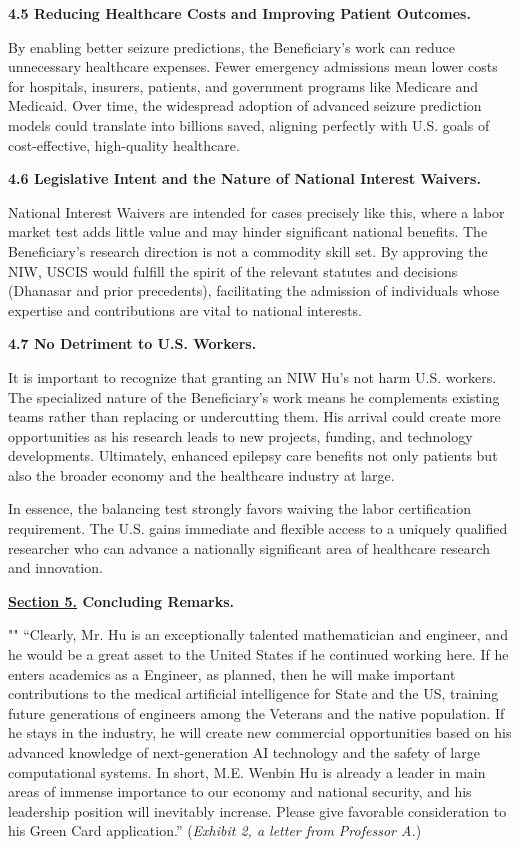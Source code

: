 \documentclass{article}
\begin{document}
{\bf 4.5 Reducing Healthcare Costs and Improving Patient Outcomes.}

By enabling better seizure predictions, the Beneficiary’s work can reduce unnecessary healthcare expenses. Fewer emergency admissions mean lower costs for hospitals, insurers, patients, and government programs like Medicare and Medicaid. Over time, the widespread adoption of advanced seizure prediction models could translate into billions saved, aligning perfectly with U.S. goals of cost-effective, high-quality healthcare.


{\bf 4.6 Legislative Intent and the Nature of National Interest Waivers.}

National Interest Waivers are intended for cases precisely like this, where a labor market test adds little value and may hinder significant national benefits. The Beneficiary’s research direction is not a commodity skill set. By approving the NIW, USCIS would fulfill the spirit of the relevant statutes and decisions (Dhanasar and prior precedents), facilitating the admission of individuals whose expertise and contributions are vital to national interests.

{\bf 4.7 No Detriment to U.S. Workers.}

It is important to recognize that granting an NIW Hu's not harm U.S. workers. The specialized nature of the Beneficiary’s work means he complements existing teams rather than replacing or undercutting them. His arrival could create more opportunities as his research leads to new projects, funding, and technology developments. Ultimately, enhanced epilepsy care benefits not only patients but also the broader economy and the healthcare industry at large.

In essence, the balancing test strongly favors waiving the labor certification requirement. The U.S. gains immediate and flexible access to a uniquely qualified researcher who can advance a nationally significant area of healthcare research and innovation.

\clearpage

{\bf \underline{Section 5.} Concluding Remarks. }

""
“Clearly, Mr. Hu is an exceptionally talented mathematician and engineer, and he would be a great asset to the United States if he continued working here. If he enters academics as a Engineer, as planned, then he will make important contributions to the medical artificial intelligence for State and the US, training future generations of engineers among the Veterans and the native population. If he stays in the industry, he will create new commercial opportunities based on his advanced knowledge of next-generation AI technology and the safety of large computational systems. In short, M.E. Wenbin Hu is already a leader in main areas of immense importance to our economy and national security, and his leadership position will inevitably increase. Please give favorable consideration to his Green Card application.” ({\it Exhibit 2, a letter from Professor A.}) 
\end{document}
